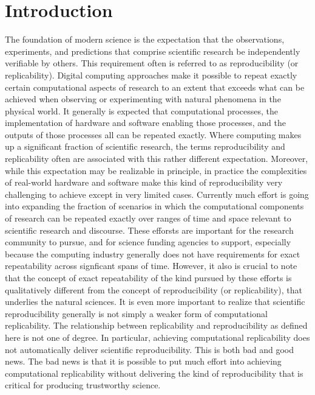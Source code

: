 \section{Introduction}

	The foundation of modern science  is the expectation that the observations, experiments, and
		predictions that comprise scientific research be independently verifiable by others.
	This requirement often is referred to as reproducibility (or replicability).
	Digital computing approaches make it possible to repeat exactly certain computational aspects of research
		to an extent that exceeds what can be achieved when observing or experimenting with natural 
		phenomena in the physical world.  
	It generally is expected that computational processes, the implementation of hardware and software 
		enabling those processes, and the outputs of those processes all can be repeated exactly.
	Where computing makes up a significant fraction of scientific research, the terms reproducibility and
		replicability often are associated with this rather different expectation. 
	Moreover, while this expectation may be realizable in principle, in practice the complexities of real-world
		hardware and software make this kind of reproducibility very challenging to achieve except in very limited cases.
	Currently much effort is going into expanding the fraction of scenarios in which the computational
		components of research can be repeated exactly over ranges of time and space relevant to scientific 
		research and discourse.
	These efforsts are important for the research community to pursue, and for science funding
		agencies to support, especially because the computing industry generally does not have 
		requirements for exact repeatability across signficant spans of time.
	However, it also is crucial to note that the concept of exact repeatability of the kind pursued by these efforts is 
		qualitatively different from the concept of reproducibility (or replicability), that underlies the natural sciences.
	It is even more important to realize that scientific reproducibility generally is not simply a weaker form of computational
		replicability.  
	The relationship between replicability and reproducibility as defined here is not one of degree.
	In particular, achieving computational replicability does not automatically deliver scientific reproducibility.
	This is both bad and good news.
	The bad news is that it is possible to put much effort into achieving computational replicability without delivering
		the kind of reproducibility that is critical for producing trustworthy science.

